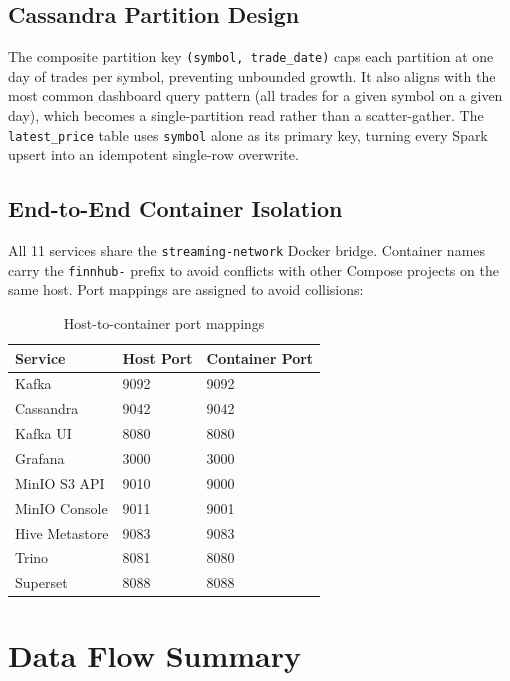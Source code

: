 \documentclass[a4paper]{article}
\begin{document}
\subsection{Cassandra Partition Design}

The composite partition key \texttt{(symbol, trade\_date)} caps each partition
at one day of trades per symbol, preventing unbounded growth. It also aligns
with the most common dashboard query pattern (all trades for a given symbol on
a given day), which becomes a single-partition read rather than a
scatter-gather. The \texttt{latest\_price} table uses \texttt{symbol} alone as
its primary key, turning every Spark upsert into an idempotent single-row
overwrite.

\subsection{End-to-End Container Isolation}

All 11 services share the \texttt{streaming-network} Docker bridge. Container
names carry the \texttt{finnhub-} prefix to avoid conflicts with other Compose
projects on the same host. Port mappings are assigned to avoid collisions:

\begin{table}[H]
\centering
\begin{tabular}{|l|l|l|}
\hline
\textbf{Service} & \textbf{Host Port} & \textbf{Container Port} \\
\hline
Kafka & 9092 & 9092 \\
\hline
Cassandra & 9042 & 9042 \\
\hline
Kafka UI & 8080 & 8080 \\
\hline
Grafana & 3000 & 3000 \\
\hline
MinIO S3 API & 9010 & 9000 \\
\hline
MinIO Console & 9011 & 9001 \\
\hline
Hive Metastore & 9083 & 9083 \\
\hline
Trino & 8081 & 8080 \\
\hline
Superset & 8088 & 8088 \\
\hline
\end{tabular}
\caption{Host-to-container port mappings}
\end{table}

\section{Data Flow Summary}
\end{document}
